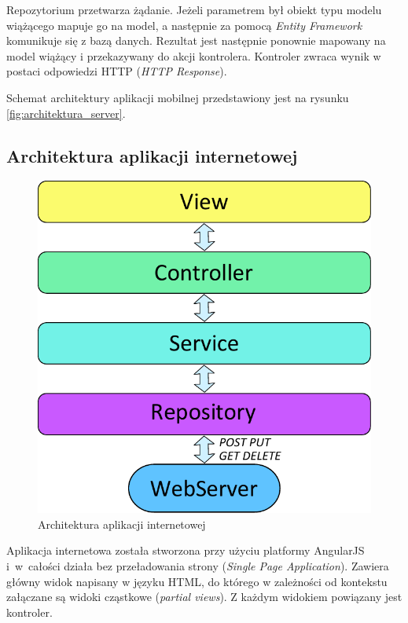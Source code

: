 \documentclass{book}
\begin{document}
			Repozytorium przetwarza żądanie. Jeżeli parametrem był obiekt typu modelu wiążącego mapuje go na model, a następnie za pomocą \emph{Entity Framework} komunikuje się z bazą danych. Rezultat jest następnie ponownie mapowany na model wiążący i przekazywany do akcji kontrolera. Kontroler zwraca wynik w postaci odpowiedzi HTTP (\emph{HTTP Response}).
			
			Schemat architektury aplikacji mobilnej przedstawiony jest na rysunku \ref{fig:architektura_server}. 			
			
			\subsection{Architektura aplikacji internetowej}		
			
			\begin{figure}
				\centering
				\includegraphics[width=1\textwidth]{images/architektura_webapp.pdf}
				\caption{Architektura aplikacji internetowej}
				\label{fig:architektura_webapp}
			\end{figure}

			Aplikacja internetowa została stworzona przy użyciu platformy AngularJS i~w~całości działa bez przeładowania strony (\emph{Single Page Application}). Zawiera główny widok napisany w języku HTML, do którego w zależności od kontekstu załączane są widoki cząstkowe (\emph{partial views}). Z każdym widokiem powiązany jest kontroler. 
			
\end{document}
